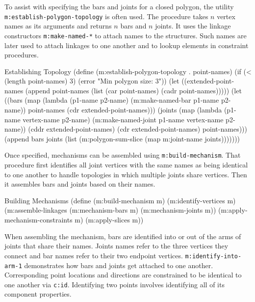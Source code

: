 To assist with specifying the bars and joints for a closed polygon,
the utility \texttt{m:establish-polygon-topology} is often used. The
procedure takes $n$ vertex names as its arguments and returns $n$ bars
and $n$ joints. It uses the linkage constructors
\texttt{m:make-named-*} to attach names to the structures.  Such names
are later used to attach linkages to one another and to lookup
elements in constraint procedures.

\begin{code-listing}
[label=est-topo]
{Establishing Topology}
(define (m:establish-polygon-topology . point-names)
  (if (< (length point-names) 3)
      (error "Min polygon size: 3"))
  (let ((extended-point-names
         (append point-names (list (car point-names) (cadr point-names)))))
    (let ((bars (map (lambda (p1-name p2-name)
                       (m:make-named-bar p1-name p2-name))
                     point-names (cdr extended-point-names)))
          (joints (map (lambda (p1-name vertex-name p2-name)
                         (m:make-named-joint p1-name vertex-name p2-name))
                       (cddr extended-point-names)
                       (cdr extended-point-names)
                       point-names)))
      (append bars joints
              (list (m:polygon-sum-slice (map m:joint-name joints)))))))
\end{code-listing}

Once specified, mechanisms can be assembled using
\texttt{m:build-mechanism}.  That procedure first identifies all joint
vertices with the same names as being identical to one another to
handle topologies in which multiple joints share vertices. Then it
assembles bars and joints based on their names.

\begin{code-listing}
{Building Mechanisms}
(define (m:build-mechanism m)
  (m:identify-vertices m)
  (m:assemble-linkages (m:mechanism-bars m)
                       (m:mechanism-joints m))
  (m:apply-mechanism-constraints m)
  (m:apply-slices m))
\end{code-listing}

When assembling the mechanism, bars are identified into or out of the
arms of joints that share their names. Joints names refer to the three
vertices they connect and bar names refer to their two endpoint
vertices.  \texttt{m:identify-into-arm-1} demonstrates how bars and
joints get attached to one another. Corresponding point locations and
directions are constrained to be identical to one another via
\texttt{c:id}. Identifying two points involves identifying all of its
component properties.

